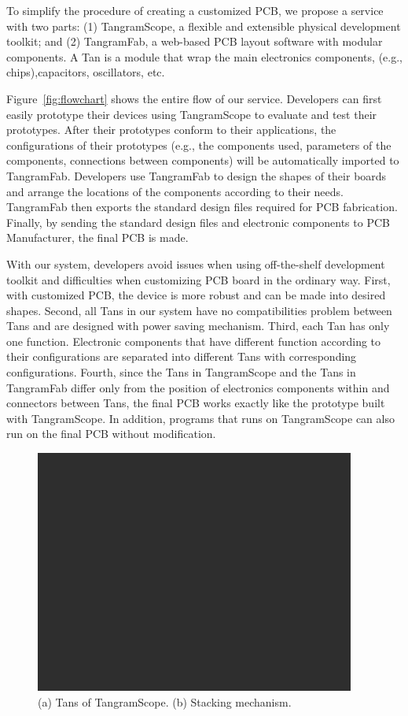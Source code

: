 To simplify the procedure of creating a customized PCB, we propose a service with two parts:
(1) TangramScope, a flexible and extensible physical development toolkit;
and
(2) TangramFab, a web-based PCB layout software with modular components.
A Tan is a module that wrap the main electronics components, (e.g., chips),capacitors, oscillators, etc.

Figure~\ref{fig:flowchart} shows the entire flow of our service.
Developers can first easily prototype their devices using TangramScope to evaluate and test their prototypes.
After their prototypes conform to their applications, the configurations of their prototypes (e.g., the components used, parameters of the components, connections between components) will be automatically imported to TangramFab.
Developers use TangramFab to design the shapes of their boards and arrange the locations of the components according to their needs.
TangramFab then exports the standard design files required for PCB fabrication.
Finally, by sending the standard design files and electronic components to PCB Manufacturer, the final PCB is made.

With our system, developers avoid issues when using off-the-shelf development toolkit and difficulties when customizing PCB board in the ordinary way.
First, with customized PCB, the device is more robust and can be made into desired shapes.
Second, all Tans in our system have no compatibilities problem between Tans and are designed with power saving mechanism.
Third, each Tan has only one function. Electronic components that have different function according to their configurations are separated into different Tans with corresponding configurations.
Fourth, since the Tans in TangramScope and the Tans in TangramFab differ only from the position of electronics components within and connectors between Tans, the final PCB works exactly like the prototype built with TangramScope. In addition, programs that runs on TangramScope can also run on the final PCB without modification.

\begin{figure}[ht]
\begin{center}
\includegraphics[height=8cm]{image/tan/space.png}
\caption{(a) Tans of TangramScope. (b) Stacking mechanism.}
\label{fig:TangramScope}
\end{center}
\end{figure}

